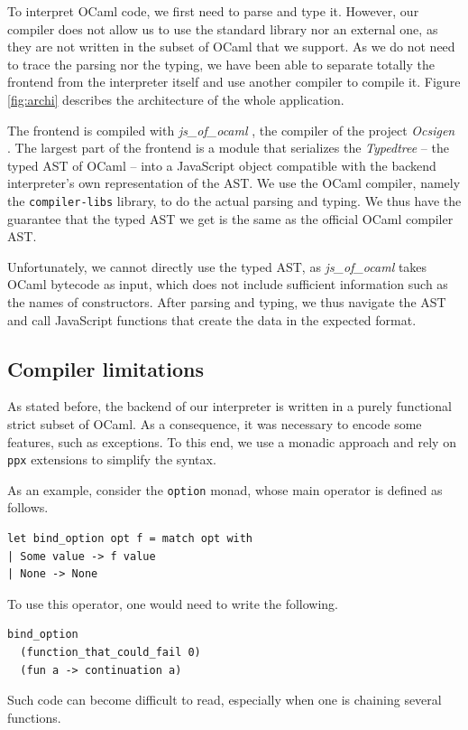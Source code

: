 \documentclass[twocolumn,a4paper]{article} \usepackage[utf8]{inputenc}
\begin{document}
To interpret OCaml code, we first need to parse and type it. However, our
compiler does not allow us to use the standard library nor an external one, as
they are not written in the subset of OCaml that we support. As we do not need
to trace the parsing nor the typing, we have been able to separate totally the
frontend from the interpreter itself and use another compiler to compile it.
Figure \ref{fig:archi} describes the architecture of the whole application.

The frontend is compiled with \emph{js\_of\_ocaml}
\cite{DBLP:journals/spe/VouillonB14}, the compiler of the project \emph{Ocsigen}
\cite{balat:hal-00691710}. The largest part of the frontend is a module that
serializes the \emph{Typedtree} -- the typed AST of OCaml -- into a JavaScript
object compatible with the backend interpreter's own representation of the AST.
We use the OCaml compiler, namely the \texttt{compiler-libs} library, to do the
actual parsing and typing. We thus have the guarantee that the typed AST we get
is the same as the official OCaml compiler AST.

Unfortunately, we cannot directly use the typed AST, as \emph{js\_of\_ocaml}
takes OCaml bytecode as input, which does not include sufficient information
such as the names of constructors. After parsing and typing, we thus navigate
the AST and call JavaScript functions that create the data in the expected format.

\subsection{Compiler limitations}

As stated before, the backend of our interpreter is written in a purely
functional strict subset of OCaml. As a consequence, it was necessary to encode
some features, such as exceptions. To this end, we use a monadic approach and
rely on \texttt{ppx} extensions to simplify the syntax.

As an example, consider the \texttt{option} monad, whose main operator is
defined as follows.

\begin{verbatim}
let bind_option opt f = match opt with
| Some value -> f value
| None -> None
\end{verbatim}

To use this operator, one would need to write the following.
\begin{verbatim}
bind_option
  (function_that_could_fail 0)
  (fun a -> continuation a)
\end{verbatim}
Such code can become difficult to read, especially when one is chaining several
functions.
\end{document}

